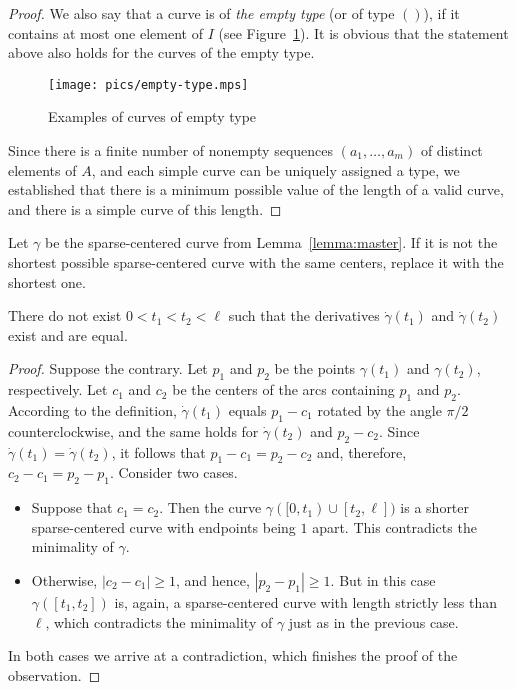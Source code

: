 \begin{proof}
We also say that a curve is of \emph{the empty type} (or of type $()$), if it contains at most one element of $I$ (see Figure~\ref{fig:emptytype}). It is obvious that the statement above also holds for the curves of the empty type.

\begin{figure}[h!]
    \centering
    \texttt{[image: pics/empty-type.mps]}
    \caption{Examples of curves of empty type}
    \label{fig:emptytype}
\end{figure}

Since there is a finite number of nonempty sequences $(a_1, \ldots, a_m)$ of distinct elements of $A$, and each simple curve can be uniquely assigned a type, we established that there is a minimum possible value of the length of a valid curve, and there is a simple curve of this length.
\end{proof}

Let $\gamma$ be the sparse-centered curve from Lemma~\ref{lemma:master}. If it is not the shortest possible sparse-centered curve with the same centers, replace it with the shortest one.

\begin{observation}
There do not exist $0 < t_1 < t_2 < \ell$ such that the derivatives $\dot{\gamma}(t_1)$ and $\dot{\gamma}(t_2)$ exist and are equal.
\end{observation}

\begin{proof}
Suppose the contrary. Let $p_1$ and $p_2$ be the points $\gamma(t_1)$ and $\gamma(t_2)$, respectively. Let $c_1$ and $c_2$ be the centers of the arcs containing $p_1$ and $p_2$. According to the definition, $\dot{\gamma}(t_1)$ equals $p_1 - c_1$ rotated by the angle $\pi/2$ counterclockwise, and the same holds for $\dot{\gamma}(t_2)$ and $p_2 - c_2$. Since $\dot{\gamma}(t_1) = \dot{\gamma}(t_2)$, it follows that $p_1 - c_1 = p_2 - c_2$ and, therefore, $c_2 - c_1 = p_2 - p_1$. Consider two cases.

\begin{itemize}
    \item Suppose that $c_1 = c_2$. Then the curve $\gamma([0, t_1)\cup[t_2, \ell])$ is a shorter sparse-centered curve with endpoints being $1$ apart. This contradicts the minimality of $\gamma$.
    
    \item Otherwise, $|c_2 - c_1| \geq 1$, and hence, $|p_2 - p_1|\geq 1$. But in this case $\gamma([t_1, t_2])$ is, again, a sparse-centered curve with length strictly less than $\ell$, which contradicts the minimality of $\gamma$ just as in the previous case.
\end{itemize}

In both cases we arrive at a contradiction, which finishes the proof of the observation.
\end{proof}

